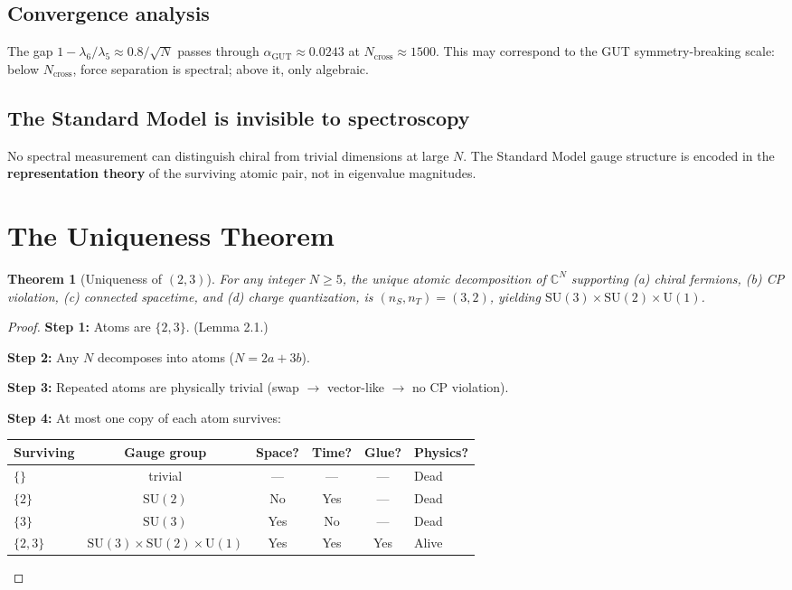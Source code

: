 \documentclass[12pt]{article}
\newtheorem{theorem}{Theorem}[section]
\theoremstyle{remark}
\begin{document}
{\subsection{Convergence analysis}

The gap $1 - \lambda_6/\lambda_5 \approx 0.8/\sqrt{N}$ passes through $\alpha_\text{GUT} \approx 0.0243$ at $N_\text{cross} \approx 1500$. This may correspond to the GUT symmetry-breaking scale: below $N_\text{cross}$, force separation is spectral; above it, only algebraic.

\subsection{The Standard Model is invisible to spectroscopy}

No spectral measurement can distinguish chiral from trivial dimensions at large $N$. The Standard Model gauge structure is encoded in the \textbf{representation theory} of the surviving atomic pair, not in eigenvalue magnitudes.

\section{The Uniqueness Theorem}

\begin{theorem}[Uniqueness of $(2,3)$]
For any integer $N \geq 5$, the unique atomic decomposition of $\mathbb{C}^N$ supporting (a) chiral fermions, (b) CP violation, (c) connected spacetime, and (d) charge quantization, is $(n_S, n_T) = (3, 2)$, yielding $\text{SU}(3)\times\text{SU}(2)\times\text{U}(1)$.
\end{theorem}

\begin{proof}
\textbf{Step 1:} Atoms are $\{2, 3\}$. (Lemma 2.1.)

\textbf{Step 2:} Any $N$ decomposes into atoms ($N = 2a + 3b$).

\textbf{Step 3:} Repeated atoms are physically trivial (swap $\to$ vector-like $\to$ no CP violation).

\textbf{Step 4:} At most one copy of each atom survives:

\begin{center}
\begin{tabular}{lccccl}
\hline
Surviving & Gauge group & Space? & Time? & Glue? & Physics? \\
\hline
$\{\}$ & trivial & --- & --- & --- & Dead \\
$\{2\}$ & $\text{SU}(2)$ & No & Yes & --- & Dead \\
$\{3\}$ & $\text{SU}(3)$ & Yes & No & --- & Dead \\
$\{2, 3\}$ & $\text{SU}(3)\!\times\!\text{SU}(2)\!\times\!\text{U}(1)$ & Yes & Yes & Yes & Alive \\
\hline
\end{tabular}
\end{center}


\end{proof}}
\end{document}
